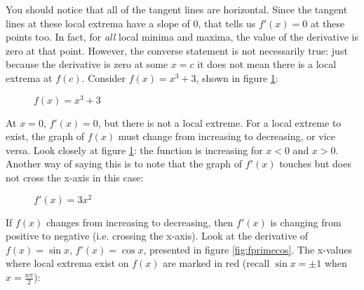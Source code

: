 
You should notice that all of the tangent lines are horizontal. Since the 
tangent lines at these local extrema have a slope of $0$, that tells us $f'(x) 
= 0$ at these points too. In fact, for \textit{all} local minima and maxima, 
the value of the derivative is zero at that point. However, the converse 
statement is not necessarily true: just because the derivative is zero at 
some $x = c$ it does not mean there is a local extrema at $f(c)$. Consider 
$f(x) = x^3+3$, shown in figure  \ref{fig:nonextrema}:

\begin{figure}
	\centering
	\caption{$f(x) = x^3+3$}
	\label{fig:nonextrema}
\end{figure}


At $x=0$, $f'(x)=0$, but there is not a local extreme. For a local extreme to 
exist, the graph of $f(x)$ must change from increasing to decreasing, or vice 
versa. Look closely at figure \ref{fig:nonextrema}: the function is increasing 
for $x<0$ and $x>0$. Another way of saying this is to note that the graph of 
$f'(x)$ touches but does not cross the x-axis in this case:

\begin{figure}
	\centering
	\caption{$f'(x) = 3x^2$}
	\label{fig:touch}
\end{figure}


If $f(x)$ changes from increasing to decreasing, then $f'(x)$ is changing from 
positive to negative (i.e. crossing the x-axis). Look at the derivative of 
$f(x) = \sin{x}$, $f'(x)=\cos{x}$, presented in figure \ref{fig:fprimecos}. 
The x-values where local extrema exist on $f(x)$ are marked in red (recall 
$\sin{x} = \pm 1$ when $x=\frac{n\pi}{2}$):

